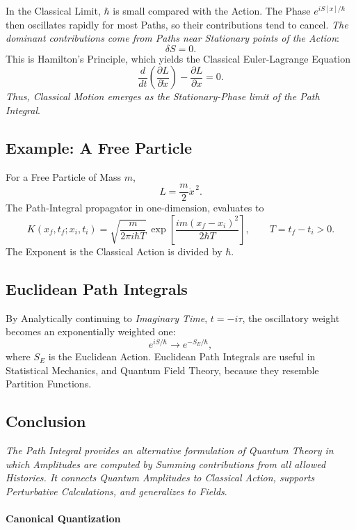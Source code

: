 \documentclass[a4paper, 10pt, onepage]{elegantbook}
\begin{document}
{In the Classical Limit, \(\hbar\) is small compared with the Action. The Phase \(e^{iS[x]/\hbar}\) then oscillates 
rapidly for most Paths, so their contributions tend to cancel. \emph{The dominant contributions come from Paths near 
Stationary points of the Action}:
\[
\delta S=0.
\]
This is Hamilton's Principle, which yields the Classical Euler-Lagrange Equation
\[
\frac{d}{dt}\left(\frac{\partial L}{\partial\dot{x}}\right)
-\frac{\partial L}{\partial x}=0.
\]
\emph{Thus, Classical Motion emerges as the Stationary-Phase limit of the
Path Integral}.

\subsection{Example: A Free Particle}

For a Free Particle of Mass \(m\),
\[
L=\frac{m}{2}\dot{x}^{\,2}.
\]
The Path-Integral propagator in one-dimension, evaluates to
\[
K(x_f,t_f;x_i,t_i)
=
\sqrt{\frac{m}{2\pi i\hbar T}}\,
\exp\!\left[
\frac{i m(x_f-x_i)^2}{2\hbar T}
\right],
\qquad T=t_f-t_i>0.
\]
The Exponent is the Classical Action is divided by \(\hbar\).

\subsection{Euclidean Path Integrals}

By Analytically continuing to \emph{Imaginary Time}, \(t=-i\tau\), the oscillatory weight becomes an exponentially 
weighted one:
\[
e^{iS/\hbar}\longrightarrow e^{-S_E/\hbar},
\]
where \(S_E\) is the Euclidean Action. Euclidean Path Integrals are useful in Statistical Mechanics, and Quantum Field 
Theory, because
they resemble Partition Functions.

\subsection{Conclusion}

\emph{The Path Integral provides an alternative formulation of Quantum Theory in which Amplitudes are computed by 
Summing contributions from
all allowed Histories. It connects Quantum Amplitudes to Classical Action, supports Perturbative Calculations, and 
generalizes
to Fields}.







\paragraph{Canonical Quantization}
\label{para:Canonical Quantization}
\noindent

}
\end{document}
